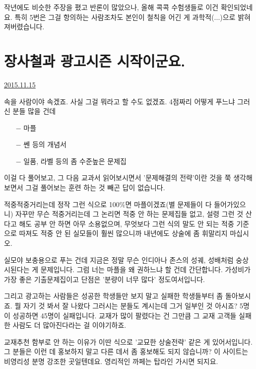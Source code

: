 작년에도 비슷한 주장을 폈고 반론이 많았으나, 올해 콕콕 수험생들로 이건 확인되었네요.
특히 5번은 그걸 항의하는 사람조차도 본인이 철칙을 어긴 게 과학적(...)으로 밝혀져버렸습니다.
\vspace{5mm}






\section{장사철과 광고시즌 시작이군요.}
\href{https://www.kockoc.com/Apoc/489593}{2015.11.15}

\vspace{5mm}

속을 사람이야 속겠죠. 사실 그걸 뭐라고 할 수도 없겠죠.
4점짜리 어떻게 푸느냐 그러신 분들 많을 건데
\begin{itemize}
    \item[$-$] 마플
    \item[$-$] 쎈 등의 개념서
    \item[$-$] 일품, 라벨 등의 좀 수준높은 문제집
\end{itemize}

이걸 다 풀어보고, 그 다음 교과서 읽어보시면서
'문제해결의 전략'이란 것을 쭉 생각해보면서 그걸 풀어보는 훈련 하는 것 빼곤 답이 없습니다.
\vspace{5mm}

적중적중거리는데 정작 그런 식으로 100$\%$면 마플이겠죠(별 문제들이 다 들어가있으니)
자꾸만 무슨 적중거리는데 그 논리면 적중 안 하는 문제집들 없고, 설령 그런 것 산다고 해도 공부 안 하면 아무 소용없으며,
무엇보다 그런 식의 말도 안 되는 적중 기준으로 따져도 적중 안 된 실모들이 훨씬 많으니까 내년에도 상술에 좀 휘말리지 마십시오.
\vspace{5mm}

실모야 보충용으로 푸는 건데 지금은 정말 무슨 인디아나 존스의 성궤, 성배처럼 숭상시된다는 게 문제입니다.
그럼 너는 마플을 왜 권하느냐 할 건데 간단합니다. 가성비가 가장 좋은 기출문제집이고 단점은 '분량이 너무 많다' 정도여서입니다.
\vspace{5mm}

그리고 광고하는 사람들은 성공한 학생들만 보지 말고 실패한 학생들부터 좀 돌아보시죠.
뭘 자기 것 봐서 잘 나왔다 그러시는 분들도 계시는데 그거 일부인 것 아시죠? 5명이 성공하면 45명이 실패입니다.
교재가 많이 팔렸다는 건 그만큼 그 교재 고객들 실패한 사람도 더 많아진다라는 걸 이야기하죠.
\vspace{5mm}

교재추천 함부로 안 하는 이유가 이딴 식으로 '교묘한 상술전략' 같은 게 있어서입니다.
그 분들은 이런 데 홍보하지 말고 다른 데서 좀 홍보해도 되지 않습니까?
이 사이트는 비영리성 분명 강조한 곳일텐데요. 영리적인 까페는 탑라인 가시면 되지요.
\vspace{5mm}

